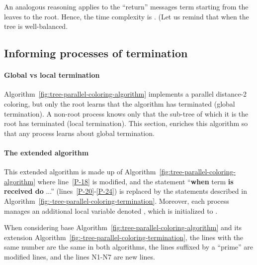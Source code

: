 \documentclass[11pt,english]{article}
\begin{document}
An analogous reasoning applies to the ``return'' messages {\sc term} 
starting from the leaves to the root. Hence, the time complexity is 
. (Let us remind that 
when the tree is well-balanced.

\subsection{Informing  processes of termination}
\label{sec:inform-others}

\paragraph{Global vs local termination}
Algorithm~\ref{fig:tree-parallel-coloring-algorithm} implements a
parallel distance-2 coloring, but only the root learns that the
algorithm has terminated (global termination). A non-root process
 knows only that the sub-tree of which it is the root has terminated
(local termination).  This section, enriches this algorithm so that any
process learns about global termination. 


\paragraph{The extended algorithm}
This extended algorithm is made up of
Algorithm~\ref{fig:tree-parallel-coloring-algorithm} where 
line~\ref{P-18} is modified, and the
statement ``{\bf when} {\sc term} {\bf is received do} ...''
(lines~\ref{P-20}-\ref{P-24}) is replaced by the statements described in 
Algorithm~\ref{fig:-tree-parallel-coloring-termination}.  Moreover,
each process  manages an additional local variable denoted
, which is initialized to .


When considering base Algorithm~\ref{fig:tree-parallel-coloring-algorithm} 
and its extension Algorithm~\ref{fig:-tree-parallel-coloring-termination}, 
the lines with the same number are the same in both algorithms, 
the lines suffixed by a ``prime'' are modified lines, and the lines 
N1-N7 are new lines. 
\end{document}
